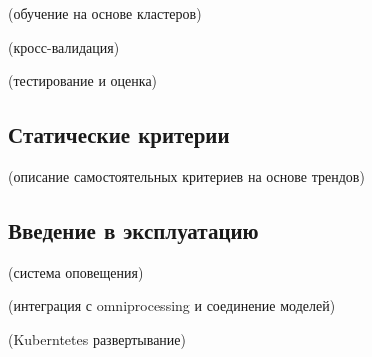 (обучение на основе кластеров)

(кросс-валидация)

(тестирование и оценка)

\subsection{Статические критерии}

(описание самостоятельных критериев на основе трендов)

\subsection{Введение в эксплуатацию}

(система оповещения)

(интеграция с omniprocessing и соединение моделей)

(Kuberntetes развертывание)



\clearpage